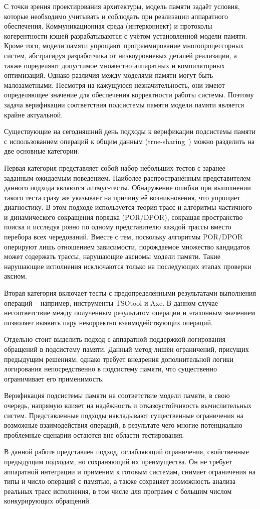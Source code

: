С точки зрения проектирования архитектуры, модель памяти задаёт
условия, которые необходимо учитывать и соблюдать при реализации
аппаратного обеспечения. Коммуникационная среда (интерконнект) и
протоколы когерентности кэшей разрабатываются с учётом установленной
модели памяти. Кроме того, модели памяти упрощают программирование
многопроцессорных систем, абстрагируя разработчика от низкоуровневых
деталей реализации, а также определяют допустимое множество
аппаратных и компиляторных оптимизаций. Однако различия между
моделями памяти могут быть малозаметными. Несмотря на кажущуюся
незначительность, они имеют определяющее значение для обеспечения
корректности работы системы. Поэтому задача верификации соответствия
подсистемы памяти модели памяти является крайне актуальной.

Существующие на сегодняшний день подходы к верификации подсистемы
памяти с использованием операций к общим данным
(true-sharing~\cite{false-sharing}) можно разделить на две основные
категории.

Первая категория представляет собой набор небольших тестов с заранее
заданным ожидаемым поведением. Наиболее распространённым
представителем данного подхода являются литмус-тесты. Обнаружение
ошибки при выполнении такого теста сразу же указывает на причину её
возникновения, что упрощает диагностику.
В этом подходе используется теория трасс и алгоритмы частичного и
динамического сокращения порядка (POR/DPOR), сокращая
пространство поиска и исследуя ровно по одному представителю
каждой трассы вместо перебора всех чередований.
Вместе с тем, поскольку алгоритмы POR/DPOR оперируют лишь отношением
зависимости,
порождаемое множество кандидатов может содержать трассы, нарушающие
аксиомы модели памяти.
Такие нарушающие исполнения исключаются только
на последующих этапах проверки аксиом.

Вторая категория включает тесты с предопределёнными результатами
выполнения операций -- например, инструменты TSOtool и Axe. В данном
случае несоответствие между полученным результатом операции и
эталонным значением позволяет выявить пару некорректно
взаимодействующих операций.

Отдельно стоит выделить подход с аппаратной поддержкой логирования
обращений в подсистему памяти. Данный метод лишён ограничений,
присущих предыдущим решениям, однако требует внедрения дополнительной
логики логирования непосредственно в подсистему памяти, что
существенно ограничивает его применимость.

Верификация подсистемы памяти на соответствие модели памяти, в свою
очередь, напрямую влияет на надёжность и отказоустойчивость
вычислительных систем. Представленные подходы накладывают
существенные ограничения на возможные взаимодействия операций, в
результате чего многие потенциально проблемные сценарии остаются вне
области тестирования.

В данной работе представлен подход, ослабляющий ограничения,
свойственные предыдущим подходам, но сохраняющий их преимущества.
Он не требует аппаратной интеграции и применим к готовым системам,
снимает ограничения на типы и число операций с памятью, а также
сохраняет возможность анализа реальных трасс исполнения, в том числе
для программ с большим числом конкурирующих обращений.

\clearpage
